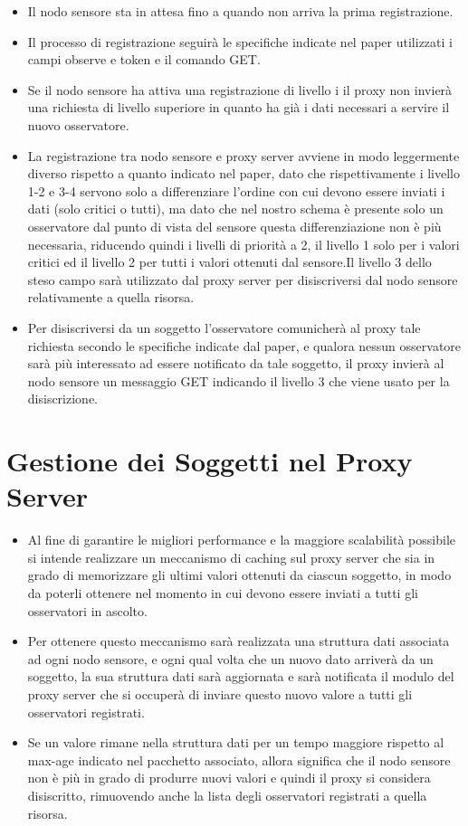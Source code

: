     \begin{itemize}
      \item Il nodo sensore sta in attesa fino a quando non arriva la prima registrazione.
      \item Il processo di registrazione seguirà le specifiche indicate nel paper utilizzati i campi observe e token e il comando GET.
      \item Se il nodo sensore ha attiva una registrazione di livello i il proxy non invierà una richiesta di livello superiore in quanto ha già i dati necessari a servire il nuovo osservatore.
      \item La registrazione tra nodo sensore e proxy server avviene in modo leggermente diverso rispetto a quanto indicato nel paper, dato che rispettivamente i livello 1-2 e 3-4 servono solo a differenziare l’ordine con cui devono essere inviati i dati (solo critici o tutti), ma dato che nel nostro schema è presente solo un osservatore dal punto di vista del sensore questa differenziazione non è più necessaria, riducendo quindi i livelli di priorità a 2, il livello 1 solo per i valori critici ed il livello 2 per tutti i valori ottenuti dal sensore.Il livello 3 dello steso campo sarà utilizzato dal proxy server per disiscriversi dal nodo sensore relativamente a quella risorsa.
      \item Per disiscriversi da un soggetto l’osservatore comunicherà al proxy tale richiesta secondo le specifiche indicate dal paper, e qualora nessun osservatore sarà più interessato ad essere notificato da tale soggetto, il proxy invierà  al nodo sensore un messaggio GET indicando il livello 3 che viene usato per la disiscrizione.
    \end{itemize}

  \section{Gestione dei Soggetti nel Proxy Server}

    \begin{itemize}
      \item Al fine di garantire le migliori performance e la maggiore scalabilità possibile si intende realizzare un meccanismo di caching sul proxy server che sia in grado di memorizzare gli ultimi valori ottenuti da ciascun soggetto, in modo da poterli ottenere nel momento in cui devono essere inviati a tutti gli osservatori in ascolto.
      \item Per ottenere questo meccanismo sarà realizzata una struttura dati associata ad ogni nodo sensore, e ogni qual volta che un nuovo dato arriverà da un soggetto, la sua struttura dati sarà aggiornata e sarà notificata il modulo del proxy server che si occuperà di inviare questo nuovo valore a tutti gli osservatori registrati.
      \item Se un valore rimane nella struttura dati per un tempo maggiore rispetto al max-age indicato nel pacchetto associato, allora significa che il nodo sensore non è più in grado di produrre nuovi valori e quindi il proxy si considera disiscritto, rimuovendo anche la lista degli osservatori registrati a quella risorsa.
    \end{itemize}

